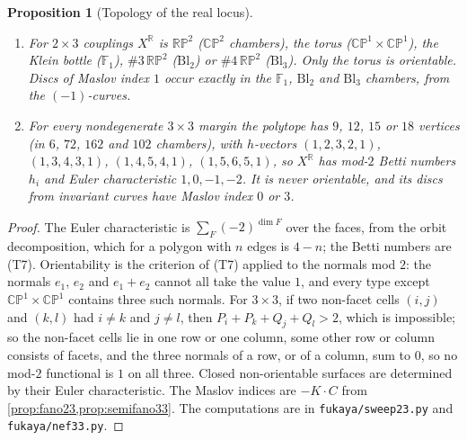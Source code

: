 \documentclass[11pt]{article}
\newtheorem{proposition}[theorem]{Proposition}
\theoremstyle{definition}
\theoremstyle{remark}
\newcommand{\R}{\mathbb{R}}
\begin{document}
\begin{proposition}[Topology of the real locus]\label{prop:reallocus}
\leavevmode
\begin{enumerate}[label=(\roman*)]
\item For $2\times3$ couplings $X^{\R}$ is $\mathbb{RP}^2$ ($\mathbb{CP}^2$ chambers), the torus ($\mathbb{CP}^1\times\mathbb{CP}^1$), the Klein bottle ($\mathbb F_1$),
  $\#3\,\mathbb{RP}^2$ ($\mathrm{Bl}_2$) or $\#4\,\mathbb{RP}^2$ ($\mathrm{Bl}_3$). Only the torus is orientable. Discs of Maslov index $1$ occur exactly
  in the $\mathbb F_1$, $\mathrm{Bl}_2$ and $\mathrm{Bl}_3$ chambers, from the $(-1)$-curves.
\item For every nondegenerate $3\times3$ margin the polytope has $9$, $12$, $15$ or $18$ vertices (in $6$, $72$, $162$ and $102$ chambers), with $h$-vectors
  $(1,2,3,2,1)$, $(1,3,4,3,1)$, $(1,4,5,4,1)$, $(1,5,6,5,1)$, so $X^{\R}$ has mod-$2$ Betti numbers $h_i$ and Euler characteristic $1,0,-1,-2$. It
  is never orientable, and its discs from invariant curves have Maslov index $0$ or $3$.
\end{enumerate}
\end{proposition}
\begin{proof}
The Euler characteristic is $\sum_F(-2)^{\dim F}$ over the faces, from the orbit decomposition, which for a polygon with $n$ edges is $4-n$; the
Betti numbers are (T7). Orientability is the criterion of (T7) applied to the normals mod $2$: the normals $e_1$, $e_2$ and $e_1+e_2$ cannot all
take the value $1$, and every type except $\mathbb{CP}^1\times\mathbb{CP}^1$ contains three such normals. For $3\times3$, if two non-facet
cells $(i,j)$ and $(k,l)$ had $i\ne k$ and $j\ne l$, then $P_i+P_k+Q_j+Q_l>2$, which is impossible; so the non-facet cells lie in one row or one
column, some other row or column consists of facets, and the three normals of a row, or of a column, sum to $0$, so no mod-$2$ functional is $1$ on
all three. Closed non-orientable surfaces are determined by their Euler characteristic. The Maslov indices are
$-K\cdot C$ from \cref{prop:fano23,prop:semifano33}. The computations are in \texttt{fukaya/sweep23.py} and \texttt{fukaya/nef33.py}.
\end{proof}
\end{document}
